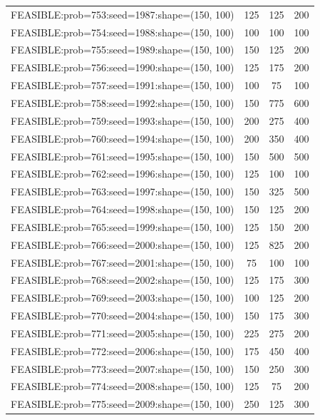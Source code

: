 \begin{longtable}{lccc}
FEASIBLE:prob=753:seed=1987:shape=(150, 100) &      125 &   125 &    200 \\
FEASIBLE:prob=754:seed=1988:shape=(150, 100) &      100 &   100 &    100 \\
FEASIBLE:prob=755:seed=1989:shape=(150, 100) &      150 &   125 &    200 \\
FEASIBLE:prob=756:seed=1990:shape=(150, 100) &      125 &   175 &    200 \\
FEASIBLE:prob=757:seed=1991:shape=(150, 100) &      100 &    75 &    100 \\
FEASIBLE:prob=758:seed=1992:shape=(150, 100) &      150 &   775 &    600 \\
FEASIBLE:prob=759:seed=1993:shape=(150, 100) &      200 &   275 &    400 \\
FEASIBLE:prob=760:seed=1994:shape=(150, 100) &      200 &   350 &    400 \\
FEASIBLE:prob=761:seed=1995:shape=(150, 100) &      150 &   500 &    500 \\
FEASIBLE:prob=762:seed=1996:shape=(150, 100) &      125 &   100 &    100 \\
FEASIBLE:prob=763:seed=1997:shape=(150, 100) &      150 &   325 &    500 \\
FEASIBLE:prob=764:seed=1998:shape=(150, 100) &      150 &   125 &    200 \\
FEASIBLE:prob=765:seed=1999:shape=(150, 100) &      125 &   150 &    200 \\
FEASIBLE:prob=766:seed=2000:shape=(150, 100) &      125 &   825 &    200 \\
FEASIBLE:prob=767:seed=2001:shape=(150, 100) &       75 &   100 &    100 \\
FEASIBLE:prob=768:seed=2002:shape=(150, 100) &      125 &   175 &    300 \\
FEASIBLE:prob=769:seed=2003:shape=(150, 100) &      100 &   125 &    200 \\
FEASIBLE:prob=770:seed=2004:shape=(150, 100) &      150 &   175 &    300 \\
FEASIBLE:prob=771:seed=2005:shape=(150, 100) &      225 &   275 &    200 \\
FEASIBLE:prob=772:seed=2006:shape=(150, 100) &      175 &   450 &    400 \\
FEASIBLE:prob=773:seed=2007:shape=(150, 100) &      150 &   250 &    300 \\
FEASIBLE:prob=774:seed=2008:shape=(150, 100) &      125 &    75 &    200 \\
FEASIBLE:prob=775:seed=2009:shape=(150, 100) &      250 &   125 &    300 \\

\end{longtable}
